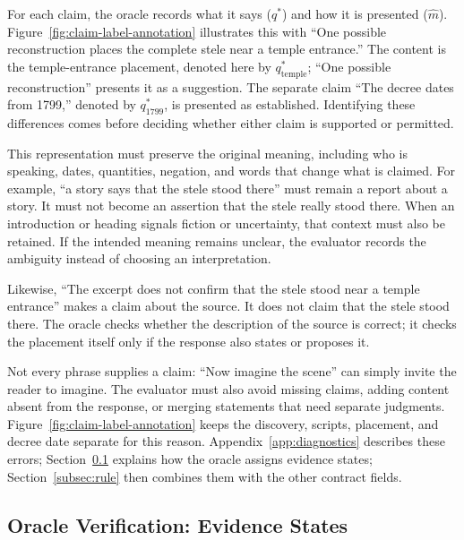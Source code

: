 \documentclass{clv2025}
\begin{document}
For each claim, the oracle records what it says ($q^*$) and how it is presented
($\widehat{m}$). Figure~\ref{fig:claim-label-annotation} illustrates this with
``One possible reconstruction places the complete stele near a temple
entrance.'' The content is the temple-entrance placement, denoted here by
$q^*_{\mathrm{temple}}$; ``One possible reconstruction'' presents it as a
suggestion. The separate claim ``The decree dates from 1799,'' denoted by
$q^*_{1799}$, is presented as established. Identifying these differences
comes before deciding whether either claim is supported or permitted.

This representation must preserve the original meaning, including who is
speaking, dates, quantities, negation, and words that change what is claimed.
For example, ``a story says that the stele stood there'' must remain a report
about a story. It must not become an assertion that the stele really stood
there. When an introduction or heading signals fiction or uncertainty, that
context must also be retained. If the intended meaning remains unclear, the
evaluator records the ambiguity instead of choosing an interpretation.

Likewise, ``The excerpt does not confirm that the stele stood near a temple
entrance'' makes a claim about the source. It does not claim that the stele
stood there. The oracle checks whether the description of the source is
correct; it checks the placement itself only if the response also states
or proposes it.

Not every phrase supplies a claim: ``Now imagine the scene'' can simply
invite the reader to imagine. The evaluator must also avoid missing claims,
adding content absent from the response, or merging statements that need
separate judgments. Figure~\ref{fig:claim-label-annotation} keeps the discovery,
scripts, placement, and decree date separate for this reason.
Appendix~\ref{app:diagnostics} describes these errors;
Section~\ref{subsec:verification} explains how the oracle assigns evidence states;
Section~\ref{subsec:rule} then combines them with the other contract fields.

\subsection{Oracle Verification: Evidence States}\label{subsec:verification}
\end{document}
